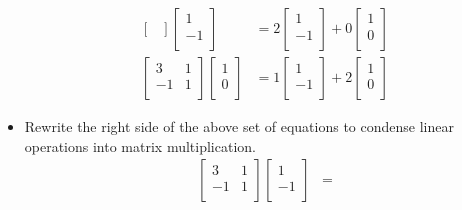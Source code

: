 \documentclass{article}
\begin{document}
\begin{itemize}
\begin{align*}
\begin{bmatrix}
        \end{bmatrix}
        \begin{bmatrix}
            1\\
            -1\\
        \end{bmatrix}
        &= 2
        \begin{bmatrix}
            1\\
            -1\\
        \end{bmatrix}
        +0
        \begin{bmatrix}
            1\\
            0\\
        \end{bmatrix}\\
        \begin{bmatrix}
            3 & 1\\
            -1 & 1\\
        \end{bmatrix}
        \begin{bmatrix}
            1\\
            0\\
        \end{bmatrix}
        &= 1
        \begin{bmatrix}
            1\\
            -1\\
        \end{bmatrix}
        +2
        \begin{bmatrix}
            1\\
            0\\
        \end{bmatrix}
    \end{align*}
    \item Rewrite the right side of the above set of equations to condense linear operations into matrix multiplication.
    \begin{align*}
        \begin{bmatrix}
            3 & 1\\
            -1 & 1\\
        \end{bmatrix}
        \begin{bmatrix}
            1\\
            -1\\
        \end{bmatrix}
        &=

\end{align*}
\end{itemize}
\end{document}
